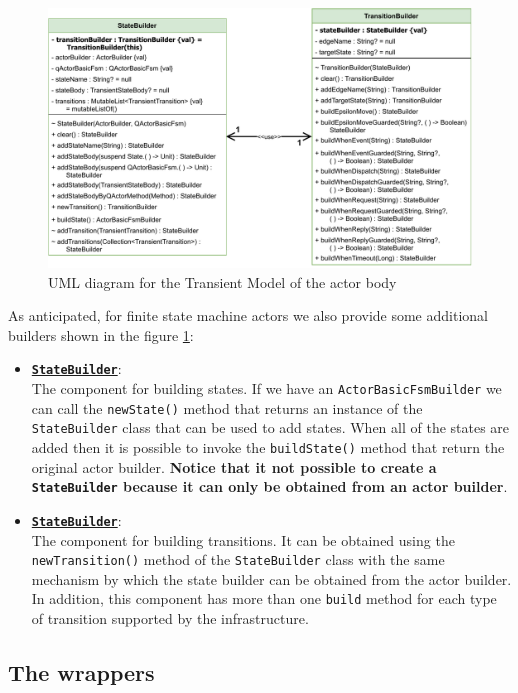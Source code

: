 \begin{figure}[h]
	\centering
	\includegraphics[width=\textwidth]{img/[UML]it.unibo.kaktor.builders_stateb_transitionb}
	\caption{UML diagram for the Transient Model of the actor body}
	\label{fig::builders_stateb_transitionb}
\end{figure}
As anticipated, for finite state machine actors we also provide some additional builders shown in the figure \ref{fig::builders_stateb_transitionb}:

\begin{itemize}
	\item 	\underline{\textbf{\texttt{StateBuilder}}}:\\
	The component for building states. If we have an \texttt{ActorBasicFsmBuilder} we can call the \verb*|newState()| method that returns an instance of the \texttt{StateBuilder} class that can be used to add states. When all of the states are added then it is possible to invoke the \texttt{buildState()} method that return the original actor builder. \textbf{Notice that it not possible to create a \texttt{StateBuilder} because it can only be obtained from an actor builder}.
	
	\item 	\underline{\textbf{\texttt{StateBuilder}}}:\\
	The component for building transitions. It can be obtained using the \verb*|newTransition()| method of the \texttt{StateBuilder} class with the same mechanism by which the state builder can be obtained from the actor builder. In addition, this component has more than one \texttt{build} method for each type of transition supported by the infrastructure.
\end{itemize}

\subsection{The wrappers}

